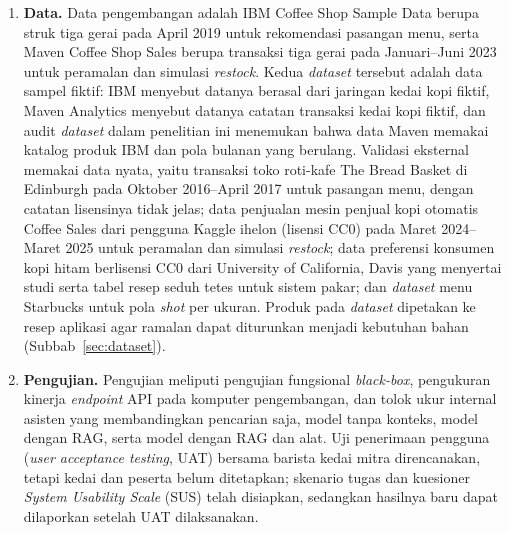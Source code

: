 \begin{enumerate}[label=\arabic*.]
\item \textbf{Data.} Data pengembangan adalah IBM Coffee Shop Sample Data \citep*{chang2019coffee} berupa struk tiga gerai pada April 2019 untuk rekomendasi pasangan menu, serta Maven Coffee Shop Sales \citep*{mavenanalytics2023coffee} berupa transaksi tiga gerai pada Januari--Juni 2023 untuk peramalan dan simulasi \textit{restock}. Kedua \textit{dataset} tersebut adalah data sampel fiktif: IBM menyebut datanya berasal dari jaringan kedai kopi fiktif, Maven Analytics menyebut datanya catatan transaksi kedai kopi fiktif, dan audit \textit{dataset} dalam penelitian ini menemukan bahwa data Maven memakai katalog produk IBM dan pola bulanan yang berulang. Validasi eksternal memakai data nyata, yaitu transaksi toko roti-kafe The Bread Basket di Edinburgh pada Oktober 2016--April 2017 \citep*{sarwar2018transactions, mittal2020bread} untuk pasangan menu, dengan catatan lisensinya tidak jelas; data penjualan mesin penjual kopi otomatis Coffee Sales dari pengguna Kaggle ihelon (lisensi CC0) pada Maret 2024--Maret 2025 \citep*{isaienkov2025coffee} untuk peramalan dan simulasi \textit{restock}; data preferensi konsumen kopi hitam berlisensi CC0 dari University of California, Davis \citep*{ristenpart2023consumer} yang menyertai studi \citet*{cotter2020consumer} serta tabel resep seduh tetes \citet*{batali2020brew} untuk sistem pakar; dan \textit{dataset} menu Starbucks \citep*{tatman2017nutrition} untuk pola \textit{shot} per ukuran. Produk pada \textit{dataset} dipetakan ke resep aplikasi agar ramalan dapat diturunkan menjadi kebutuhan bahan (Subbab~\ref{sec:dataset}).
\item \textbf{Pengujian.} Pengujian meliputi pengujian fungsional \textit{black-box}, pengukuran kinerja \textit{endpoint} API pada komputer pengembangan, dan tolok ukur internal asisten yang membandingkan pencarian saja, model tanpa konteks, model dengan RAG, serta model dengan RAG dan alat. Uji penerimaan pengguna (\textit{user acceptance testing}, UAT) bersama barista kedai mitra direncanakan, tetapi kedai dan peserta belum ditetapkan; skenario tugas dan kuesioner \textit{System Usability Scale} (SUS) telah disiapkan, sedangkan hasilnya baru dapat dilaporkan setelah UAT dilaksanakan.

\end{enumerate}
